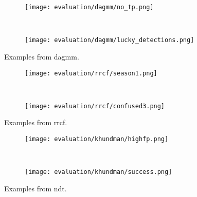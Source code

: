 \begin{figure}[htp!]
    \begin{subfigure}[b]{\linewidth}
        \centering
        \texttt{[image: evaluation/dagmm/no\_tp.png]}
    \end{subfigure}%
    \\
    \begin{subfigure}[b]{\linewidth}
        \centering
        \texttt{[image: evaluation/dagmm/lucky\_detections.png]}
    \end{subfigure}
    \caption{Examples from \gls{dagmm}.}\label{fig:dagmm-output}
\end{figure}

\begin{figure}[htp!]
    \begin{subfigure}[b]{\linewidth}
        \centering
        \texttt{[image: evaluation/rrcf/season1.png]}
    \end{subfigure}%
    \\
    \begin{subfigure}[b]{\linewidth}
        \centering
        \texttt{[image: evaluation/rrcf/confused3.png]}
    \end{subfigure}
    \caption{Examples from \gls{rrcf}.}\label{fig:rrcf-output}
\end{figure}

\begin{figure}[htp!]
    \begin{subfigure}[b]{\linewidth}
        \centering
        \texttt{[image: evaluation/khundman/highfp.png]}
        \label{fig:khundman-fp}
    \end{subfigure}%
    \\
    \begin{subfigure}[b]{\linewidth}
        \centering
        \texttt{[image: evaluation/khundman/success.png]}
        \label{fig:khundman-success}
    \end{subfigure}
    \caption{Examples from \gls{ndt}.}\label{fig:khundman-output}
\end{figure}

